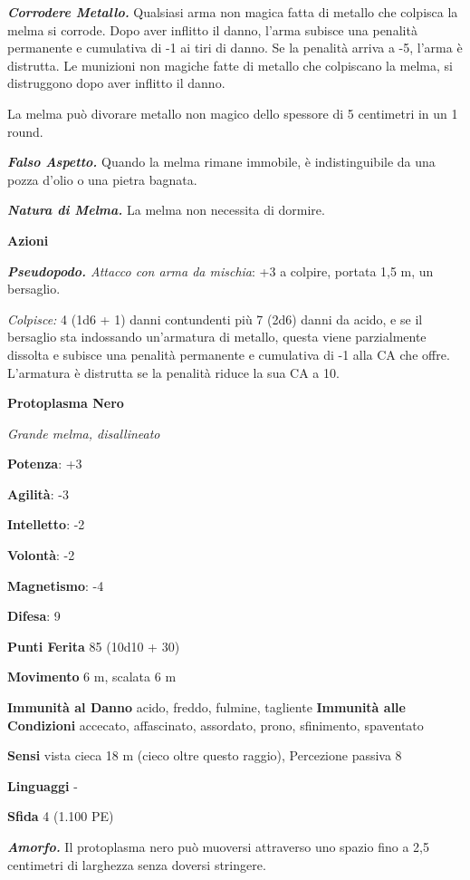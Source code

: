\begin{multicols}{2}
\emph{\textbf{Corrodere Metallo.}} Qualsiasi arma non magica fatta di
metallo che colpisca la melma si corrode. Dopo aver inflitto il danno,
l'arma subisce una penalità permanente e cumulativa di -1 ai tiri di
danno. Se la penalità arriva a -5, l'arma è distrutta. Le munizioni non
magiche fatte di metallo che colpiscano la melma, si distruggono dopo
aver inflitto il danno.

La melma può divorare metallo non magico dello spessore di 5 centimetri
in un 1 round.

\emph{\textbf{Falso Aspetto.}} Quando la melma rimane immobile, è
indistinguibile da una pozza d'olio o una pietra bagnata.

\emph{\textbf{Natura di Melma.}} La melma non necessita di dormire.

\textbf{Azioni}

\emph{\textbf{Pseudopodo.} Attacco con arma da mischia}: +3 a colpire,
portata 1,5 m, un bersaglio.

\emph{Colpisce:} 4 (1d6 + 1) danni contundenti più 7 (2d6) danni da
acido, e se il bersaglio sta indossando un'armatura di metallo, questa
viene parzialmente dissolta e subisce una penalità permanente e
cumulativa di -1 alla CA che offre. L'armatura è distrutta se la
penalità riduce la sua CA a 10.



\textbf{Protoplasma Nero}

\emph{Grande melma, disallineato}

\textbf{Potenza}: +3

\textbf{Agilità}: -3

\textbf{Intelletto}: -2

\textbf{Volontà}: -2

\textbf{Magnetismo}: -4

\textbf{Difesa}: 9

\textbf{Punti Ferita} 85 (10d10 + 30)

\textbf{Movimento} 6 m, scalata 6 m

\textbf{Immunità al Danno} acido, freddo, fulmine, tagliente
\textbf{Immunità alle Condizioni} accecato, affascinato, assordato,
prono, sfinimento, spaventato

\textbf{Sensi} vista cieca 18 m (cieco oltre questo raggio), Percezione
passiva 8

\textbf{Linguaggi} -

\textbf{Sfida} 4 (1.100 PE)

\emph{\textbf{Amorfo.}} Il protoplasma nero può muoversi attraverso uno
spazio fino a 2,5 centimetri di larghezza senza doversi stringere.


\end{multicols}
